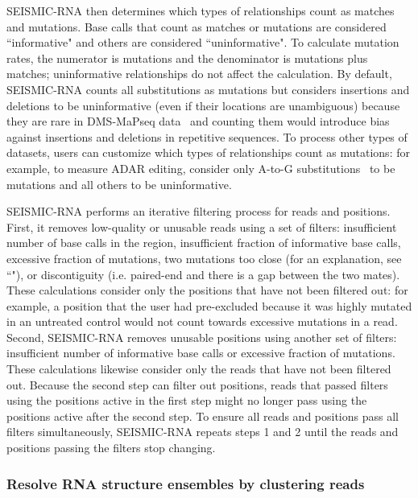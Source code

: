 \documentclass[11pt]{article}
\begin{document}
SEISMIC-RNA then determines which types of relationships count as matches and mutations.
Base calls that count as matches or mutations are considered ``informative" and others are considered ``uninformative".
To calculate mutation rates, the numerator is mutations and the denominator is mutations plus matches; uninformative relationships do not affect the calculation.
By default, SEISMIC-RNA counts all substitutions as mutations but considers insertions and deletions to be uninformative (even if their locations are unambiguous) because they are rare in DMS-MaPseq data~\cite{Zubradt2016} and counting them would introduce bias against insertions and deletions in repetitive sequences.
To process other types of datasets, users can customize which types of relationships count as mutations: for example, to measure ADAR editing, consider only A-to-G substitutions~\cite{Okada2019} to be mutations and all others to be uninformative.

SEISMIC-RNA performs an iterative filtering process for reads and positions.
First, it removes low-quality or unusable reads using a set of filters: insufficient number of base calls in the region, insufficient fraction of informative base calls, excessive fraction of mutations, two mutations too close (for an explanation, see ``"), or discontiguity (i.e. paired-end and there is a gap between the two mates).
These calculations consider only the positions that have not been filtered out: for example, a position that the user had pre-excluded because it was highly mutated in an untreated control would not count towards excessive mutations in a read.
Second, SEISMIC-RNA removes unusable positions using another set of filters: insufficient number of informative base calls or excessive fraction of mutations.
These calculations likewise consider only the reads that have not been filtered out.
Because the second step can filter out positions, reads that passed filters using the positions active in the first step might no longer pass using the positions active after the second step.
To ensure all reads and positions pass all filters simultaneously, SEISMIC-RNA repeats steps 1 and 2 until the reads and positions passing the filters stop changing.

\subsubsection{Resolve RNA structure ensembles by clustering reads}
\label{seismic-cluster}
\end{document}
